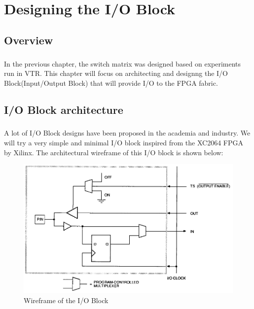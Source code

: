 %
%
\let\textcircled=\pgftextcircled
\chapter{Designing the I/O Block}
\label{chap:IO_BLOCK_design}
\paragraph{}

\section{Overview}

\paragraph{}
In the previous chapter, the switch matrix was designed based on experiments run in VTR. This chapter will focus on architecting and designng the I/O Block(Input/Output Block) that will provide I/O to the FPGA fabric.

\section{I/O Block architecture}
\paragraph{}

A lot of I/O Block designs have been proposed in the academia and industry. We will try a very simple and minimal I/O block inspired from the XC2064 FPGA by Xilinx. The architectural wireframe of this I/O block is shown below:

\begin{figure}[H]
\centering
\includegraphics[width=\textwidth]{ioblock_wireframe.png}
\caption{Wireframe of the I/O Block}
\label{fig:Figure}
\end{figure}

